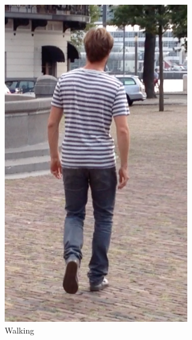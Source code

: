 \begin{figure}
  \centering
  \begin{subfigure}[b]{0.2\textwidth}
    \includegraphics[width=\textwidth]{./Figures/chapter6/data_collection/stills/jos_walking.png}
    \caption{Walking}
    \label{fig:stills_subject_2_walking}
  \end{subfigure}%
  \qquad \qquad \qquad
  \begin{subfigure}[b]{0.2\textwidth}

\end{subfigure}
\end{figure}
